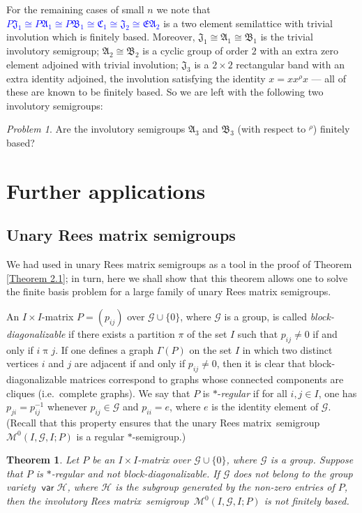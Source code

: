 \documentclass[preprint,1p,times]{elsarticle}
\DeclareMathOperator{\var}{\mathsf{var}}
\numberwithin{equation}{section}
\newtheorem{Thm}{Theorem}[section]
\theoremstyle{remark}
\newtheorem{Problem}{Problem}[section]
\def\blue#1{\textcolor{blue}{#1}}
\def\cal{\mathcal}
\def\Mc{{\cal M}}
\def\m{\mathrel}
\def\Rm{Rees matrix}
\def\sm{semi\-group}
\def\A{\mathfrak{A}}
\def\C{\mathfrak{C}}
\def\B{\mathfrak{B}}
\def\J{\mathfrak{J}}
\begin{document}
For the remaining cases of small $n$ we note that \blue{$P\J_1\cong P\A_1\cong P\B_1\cong \C_1\cong \J_2\cong\mathfrak{EA}_2$} is a two element semilattice
with trivial involution which is finitely based. Moreover, $\J_1\cong \A_1\cong \B_1$ is the trivial involutory
semigroup;  $\A_2\cong \B_2$ is a cyclic group
of order $2$ with an extra zero element adjoined with trivial involution; $\J_3$ is a $2\times 2$ rectangular band with
an extra identity adjoined, the involution satisfying the identity $x=xx^\rho x$ --- all of these are known to be
finitely based. So we are left with the following two involutory semigroups:

\begin{Problem} Are the involutory semigroups $\A_3$ and $\B_3$ (with respect to $^\rho$) finitely based?
\end{Problem}

\section{Further applications}

\subsection{Unary Rees matrix semigroups}

We had used in \cite{adv} unary Rees matrix semigroups as a tool in the proof of Theorem \ref{Theorem 2.1}; in turn,
here we shall show that this theorem allows one to solve the finite basis problem for a large family of unary Rees
matrix semigroups.

An $I\times I$-matrix $P=(p_{ij})$ over $\mathcal{G}\cup\{0\}$, where $\mathcal{G}$ is a group, is called
\emph{block-diagonalizable} if there exists a partition $\pi$ of the set $I$ such that $p_{ij}\ne 0$ if and only if
$i\m{\pi}j$. If one defines a graph $\Gamma(P)$ on the set $I$ in which two distinct vertices $i$ and $j$ are adjacent
if and only if $p_{ij}\ne0$, then it is clear that block-diagonalizable matrices correspond to graphs whose connected
components are cliques (i.e.\ complete graphs). We say that $P$ is $*$-\emph{regular} if for all $i,j\in I$, one has
$p_{ji}=p_{ij}^{-1}$ whenever $p_{ij}\in \mathcal{G}$ and $p_{ii}=e$, where $e$ is the identity element of
$\mathcal{G}$. (Recall that this property ensures that the unary \Rm\ \sm\ $\Mc^0(I,\mathcal{G},I;P)$ is a regular
$*$-semigroup.)

\begin{Thm}
\label{Rees matrix} Let $P$ be an $I\times I$-matrix over $\mathcal{G}\cup\{0\}$, where $\mathcal{G}$ is a group.
Suppose that $P$ is $*$-regular and not block-diagonalizable. If $\mathcal{G}$ does not belong to the group variety
$\var\mathcal{H}$, where $\mathcal{H}$ is the subgroup generated by the non-zero entries of $P$, then the involutory \Rm\
\sm\ $\Mc^0(I,\mathcal{G},I;P)$ is not finitely based.
\end{Thm}
\end{document}

